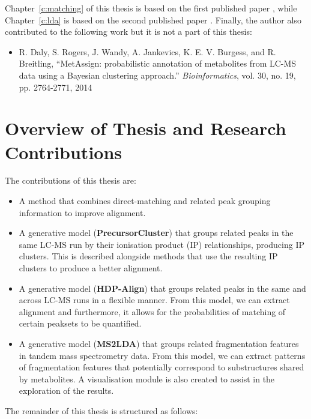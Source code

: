 Chapter~\ref{c:matching} of this thesis is based on the first published paper \cite{wandy2015incorporating}, while Chapter~\ref{c:lda} is based on the second published paper \cite{vanderHooft29112016}. Finally, the author also contributed to the following work \cite{Daly2014} but it is not a part of this thesis:

\begin{itemize}
\item R. Daly, S. Rogers, J. Wandy, A. Jankevics, K. E. V. Burgess, and R. Breitling, ``MetAssign: probabilistic annotation of metabolites from LC-MS data using a Bayesian clustering approach.'' \textit{Bioinformatics}, vol. 30, no. 19, pp. 2764-2771, 2014
\end{itemize}

\section{Overview of Thesis and Research Contributions}

The contributions of this thesis are:

\begin{itemize}
\item A method that combines direct-matching and related peak grouping information to improve alignment.
\item A generative model (\textbf{PrecursorCluster}) that groups related peaks in the same LC-MS run by their ionisation product (IP) relationships, producing IP clusters. This is described alongside methods that use the resulting IP clusters to produce a better alignment.
\item A generative model (\textbf{HDP-Align}) that groups related peaks in the same and across LC-MS runs in a flexible manner. From this model, we can extract alignment and furthermore, it allows for the probabilities of matching of certain peaksets to be quantified.
\item A generative model (\textbf{MS2LDA}) that groups related fragmentation features in tandem mass spectrometry data. From this model, we can extract patterns of fragmentation features that potentially correspond to substructures shared by metabolites. A visualisation module is also created to assist in the exploration of the results.
\end{itemize}

The remainder of this thesis is structured as follows:

